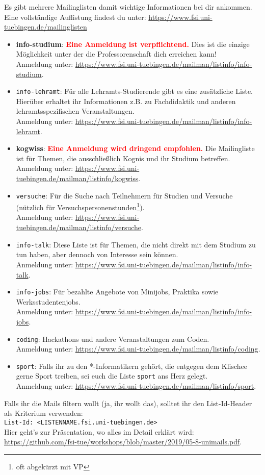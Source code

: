 Es gibt mehrere Mailinglisten damit wichtige Informationen bei dir ankommen.\\
Eine vollständige Auflistung findest du unter: \url{https://www.fsi.uni-tuebingen.de/mailinglisten}
\begin{itemize}
\item \textbf{info-studium}: \textcolor{red}{\textbf{Eine Anmeldung ist verpflichtend.}} Dies ist die einzige Möglichkeit unter der die Professorenschaft dich erreichen kann! \\
Anmeldung unter: \url{https://www.fsi.uni-tuebingen.de/mailman/listinfo/info-studium}.
\iflehramt
\item \texttt{info-lehramt}: Für alle Lehramts-Studierende gibt es eine zusätzliche Liste. Hierüber erhaltet ihr Informationen z.B. zu Fachdidaktik und anderen lehramtsspezifischen Veranstaltungen.\\
Anmeldung unter: \url{https://www.fsi.uni-tuebingen.de/mailman/listinfo/info-lehramt}.
\fi
\ifkogwiss
\item \textbf{kogwiss}: \textcolor{red}{\textbf{Eine Anmeldung wird dringend empfohlen.}} Die Mailingliste ist für Themen, die ausschließlich Kognis und ihr Studium betreffen. \\
Anmeldung unter: \url{https://www.fsi.uni-tuebingen.de/mailman/listinfo/kogwiss}.

\item \texttt{versuche}: Für die Suche nach Teilnehmern für Studien und Versuche (nützlich für Versuchspersonenstunden\footnote{oft abgekürzt mit VP}).\\
Anmeldung unter: \url{https://www.fsi.uni-tuebingen.de/mailman/listinfo/versuche}.
\fi
\item \texttt{info-talk}: Diese Liste ist für Themen, die nicht direkt mit dem Studium zu tun haben, aber dennoch von Interesse sein können.\\
Anmeldung unter: \url{https://www.fsi.uni-tuebingen.de/mailman/listinfo/info-talk}.
\item \texttt{info-jobs}: Für bezahlte Angebote von Minijobs, Praktika sowie  Werksstudentenjobs.\\
Anmeldung unter: \url{https://www.fsi.uni-tuebingen.de/mailman/listinfo/info-jobs}.
\item \texttt{coding}: Hackathons und andere Veranstaltungen zum Coden.\\
Anmeldung unter: \url{https://www.fsi.uni-tuebingen.de/mailman/listinfo/coding}.
\item \texttt{sport}: Falls ihr zu den *-Informatikern gehört, die entgegen dem Klischee gerne Sport treiben, sei euch die Liste \texttt{sport} ans Herz gelegt.\\
Anmeldung unter: \url{https://www.fsi.uni-tuebingen.de/mailman/listinfo/sport}.
\end{itemize}
Falls ihr die Mails filtern wollt (ja, ihr wollt das), solltet ihr den List-Id-Header als Kriterium verwenden: \\
\texttt{List-Id: <LISTENNAME.fsi.uni-tuebingen.de>} \\
Hier geht's zur Präsentation, wo alles im Detail erklärt wird: \url{https://github.com/fsi-tue/workshops/blob/master/2019/05-8-unimails.pdf}.
